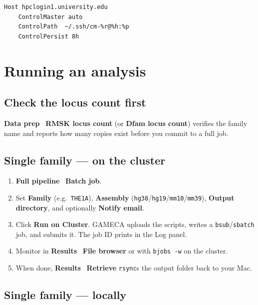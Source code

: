 \documentclass[11pt]{article}
\begin{document}
\begin{lstlisting}
Host hpclogin1.university.edu
    ControlMaster auto
    ControlPath  ~/.ssh/cm-%r@%h:%p
    ControlPersist 8h
\end{lstlisting}

\section{Running an analysis}

\subsection{Check the locus count first}

\textbf{Data prep} \textrightarrow\ \textbf{RMSK locus count} (or
\textbf{Dfam locus count}) verifies the family name and reports how many
copies exist before you commit to a full job.

\subsection{Single family --- on the cluster}

\begin{enumerate}
  \item \textbf{Full pipeline} \textrightarrow\ \textbf{Batch job}.
  \item Set \textbf{Family} (e.g.\ \texttt{THE1A}), \textbf{Assembly}
        (\texttt{hg38}/\texttt{hg19}/\texttt{mm10}/\texttt{mm39}),
        \textbf{Output directory}, and optionally \textbf{Notify email}.
  \item Click \textbf{Run on Cluster}. GAMECA uploads the scripts, writes
        a \texttt{bsub}/\texttt{sbatch} job, and submits it. The job ID
        prints in the Log panel.
  \item Monitor in \textbf{Results} \textrightarrow\ \textbf{File browser}
        or with \texttt{bjobs -w} on the cluster.
  \item When done, \textbf{Results} \textrightarrow\ \textbf{Retrieve}
        \texttt{rsync}s the output folder back to your Mac.
\end{enumerate}

\subsection{Single family --- locally}
\end{document}
